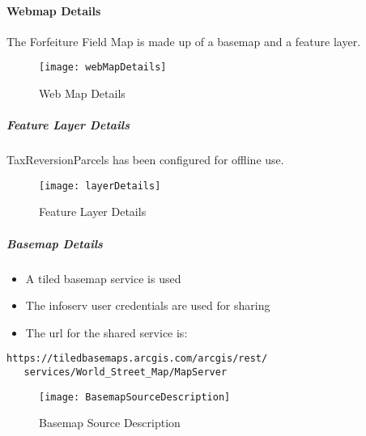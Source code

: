 \documentclass[class=book , crop=false, titlepage, twoside, multi={itemize, figure, verbatim}, float=false]{standalone}
\begin{document}
\paragraph{Webmap Details}The Forfeiture Field Map is made up of a basemap and a feature layer.
%
%
\begin{figure}[h!]
\centering
\texttt{[image: webMapDetails]}
\caption{Web Map Details}
\end{figure}

\subparagraph{Feature Layer Details}TaxReversionParcels has been configured for offline use.
\begin{figure}[h!]
\centering
\texttt{[image: layerDetails]}
\caption{Feature Layer Details}
\end{figure}

\clearpage
%
%
%
%
\subparagraph{Basemap Details}
\begin{itemize}
  \setlength\itemsep{4em}
  \item A tiled basemap service is used
  \item The infoserv user credentials are used for sharing
  \item The url for the shared service is:
\end{itemize}

\begin{verbatim}
https://tiledbasemaps.arcgis.com/arcgis/rest/
   services/World_Street_Map/MapServer
\end{verbatim}
%
%
\begin{figure}[h!]
\centering
\texttt{[image: BasemapSourceDescription]}
\caption{Basemap Source Description}
\end{figure}
\clearpage
%
%
%
%
%
%
%
\end{document}
